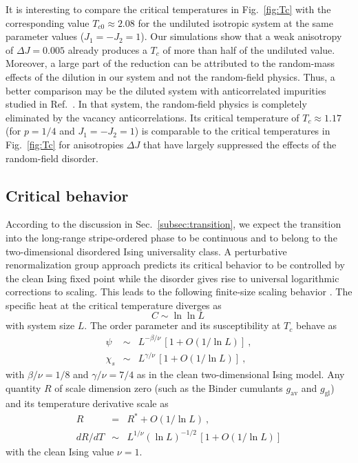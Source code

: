 \documentclass[twocolumn,showpacs,superscriptaddress,aps,prb]{revtex4-2}
\begin{document}
It is interesting to compare the critical temperatures in Fig.\ \ref{fig:Tc} with
the corresponding value $T_{c0} \approx 2.08$ \cite{KalzHoneckerMoliner11} for the
undiluted isotropic system at the same parameter values ($J_1=-J_2=1$). Our simulations
show that a weak anisotropy of $\Delta J=0.005$ already produces a $T_c$ of more than
half of the undiluted value. Moreover, a large part of the reduction can be attributed
to the random-mass effects of the dilution in our system and not the random-field physics.
Thus, a better comparison may be the diluted system with anticorrelated impurities
studied in Ref.\  \cite{KunwarSenVojtaNarayanan18}. In that system, the random-field
physics is completely eliminated by the vacancy anticorrelations. Its
critical temperature of $T_c \approx 1.17$  (for $p=1/4$ and $J_1=-J_2=1$) is comparable
to the critical temperatures in Fig.\ \ref{fig:Tc} for anisotropies $\Delta J$ that have
largely suppressed the effects of the random-field disorder.


\subsection{Critical behavior}
\label{subsec:res_critical}

According to the discussion in Sec.\ \ref{subsec:transition}, we expect the transition into
the long-range stripe-ordered phase to be continuous and to belong to the two-dimensional
disordered Ising universality class. A perturbative renormalization group approach
\cite{DotsenkoDotsenko83,Shalaev84,Shankar87} predicts its critical behavior to be controlled
by the clean Ising fixed point while the disorder gives rise to universal logarithmic corrections
to scaling. This leads to the following finite-size scaling behavior \cite{MazzeoKuhn99,HTPV08,KennaRuizLorenzo08}.
The specific heat at the critical temperature diverges as
\begin{equation}
C \sim \ln \ln L~
\label{eq:C_lnln}
\end{equation}
with system size $L$.
The order parameter and its susceptibility at $T_c$ behave as
\begin{eqnarray}
\psi  &\sim& L^{-\beta/\nu}\, [1+O(1/\ln L)]~,
\label{eq:M_ln}\\
\chi_s &\sim& L^{\gamma/\nu}\,[1+O(1/\ln L)]~,
\label{eq:chi_ln}
\end{eqnarray}
with $\beta/\nu=1/8$ and  $\gamma/\nu=7/4$ as in the clean two-dimensional
Ising model. Any quantity $R$ of scale dimension zero
(such as the Binder cumulants $g_\mathrm{av}$ and $g_\mathrm{gl}$)
and its temperature derivative scale as
\begin{eqnarray}
R &=& R^\ast + O(1/\ln L)~,
\label{eq:R_ln}\\
dR/dT  &\sim& L^{1/\nu}(\ln L)^{-1/2}\, [1+O(1/\ln L)]
\label{eq:dRdT_ln}
\end{eqnarray}
with the clean Ising value $\nu=1$.
\end{document}
